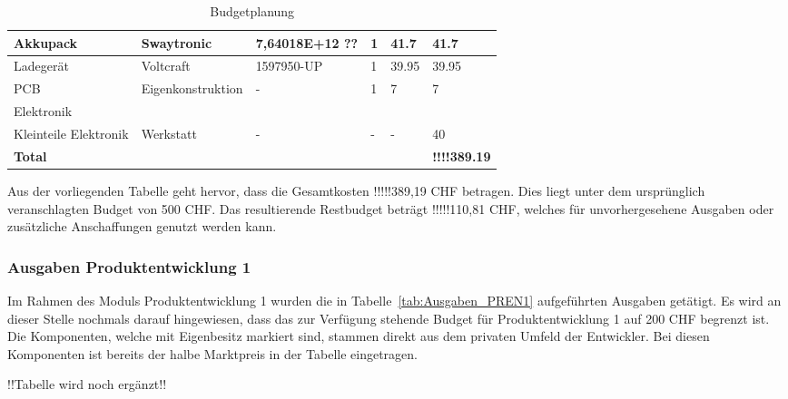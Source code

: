 \documentclass[main.tex]{subfiles} %
\begin{document}
\begin{table}[h]
\begin{tabular}{|p{3cm}|p{3cm}|p{3cm}|p{1cm}|p{1.5cm}|p{1cm}|}
        Akkupack                               & Swaytronic          & 7,64018E+12 ??          & 1               & 41.7                      & 41.7                        \\ \hline
        Ladegerät                              & Voltcraft           & 1597950-UP              & 1               & 39.95                     & 39.95                       \\ \hline
        PCB                                    & Eigenkonstruktion   & -                       & 1               & 7                         & 7                           \\ \hline
        \rowcolor{lightgray} Elektronik        &                     &                         &                 &                           &                             \\ \hline
        Kleinteile Elektronik                  & Werkstatt           & -                       & -               & -                         & 40                          \\ \hline
        \textbf{Total}                         &                     &                         &                 &                           & \textbf{!!!!389.19}                \\ \hline
    \end{tabular}
    \caption{Budgetplanung}
    \label{tab:Budgetplanung}
\end{table}

Aus der vorliegenden Tabelle geht hervor, dass die Gesamtkosten !!!!!389,19 CHF betragen.
Dies liegt unter dem ursprünglich veranschlagten Budget von 500 CHF. 
Das resultierende Restbudget beträgt !!!!!110,81 CHF, welches für unvorhergesehene Ausgaben oder zusätzliche
Anschaffungen genutzt werden kann.

\subsubsection{Ausgaben Produktentwicklung 1}
Im Rahmen des Moduls Produktentwicklung 1 wurden die in
Tabelle~\ref{tab:Ausgaben_PREN1} aufgeführten Ausgaben getätigt. Es wird 
an dieser Stelle nochmals darauf hingewiesen, dass das zur Verfügung stehende 
Budget für Produktentwicklung 1 auf 200 CHF begrenzt ist. Die Komponenten, welche mit 
Eigenbesitz markiert sind, stammen direkt aus dem privaten Umfeld der Entwickler.
Bei diesen Komponenten ist bereits der halbe Marktpreis in der Tabelle eingetragen.

!!Tabelle wird noch ergänzt!!
\newpage
\end{document}
